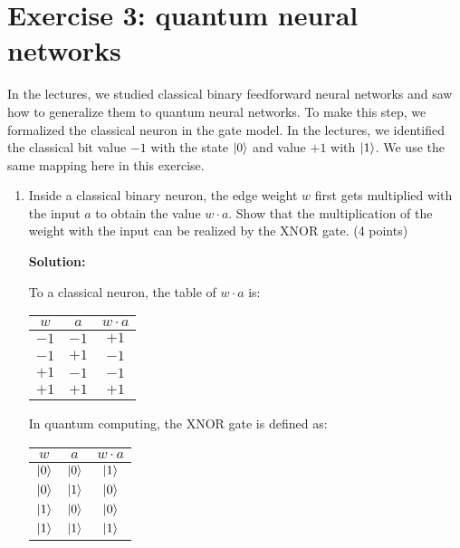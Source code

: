 \documentclass[12pt]{article}
\begin{document}
\section{Exercise 3: quantum neural networks}
In the lectures, we studied classical binary feedforward neural networks and saw how to generalize them to quantum neural networks. To make this step, we formalized the classical neuron in the gate model. In the lectures, we identified the classical bit value $-1$ with the state $\ket{0}$ and value $+1$ with $\ket{1}$. We use the same mapping here in this exercise.
\begin{enumerate}
    \item Inside a classical binary neuron, the edge weight $w$ first gets multiplied with the input $a$ to obtain the value $w \cdot a$. Show that the multiplication of the weight with the input can be realized by the XNOR gate. (4 points)

          \textbf{Solution:}

          To a classical neuron, the table of $w\cdot a$ is:
          \begin{table}[h]
              \centering
              \begin{tabular}{|c|c|c|}
                  \hline
                  $w$  & $a$  & $w\cdot a$ \\
                  \hline
                  $-1$ & $-1$ & $+1$       \\
                  \hline
                  $-1$ & $+1$ & $-1$       \\
                  \hline
                  $+1$ & $-1$ & $-1$       \\
                  \hline
                  $+1$ & $+1$ & $+1$       \\
                  \hline
              \end{tabular}
          \end{table}

          In quantum computing, the XNOR gate is defined as:
          \begin{table}[h]
              \centering
              \begin{tabular}{|c|c|c|}
                  \hline
                  $w$       & $a$       & $w\cdot a$ \\
                  \hline
                  $\ket{0}$ & $\ket{0}$ & $\ket{1}$  \\
                  \hline
                  $\ket{0}$ & $\ket{1}$ & $\ket{0}$  \\
                  \hline
                  $\ket{1}$ & $\ket{0}$ & $\ket{0}$  \\
                  \hline
                  $\ket{1}$ & $\ket{1}$ & $\ket{1}$  \\
                  \hline
              \end{tabular}
          \end{table}


\end{enumerate}
\end{document}
